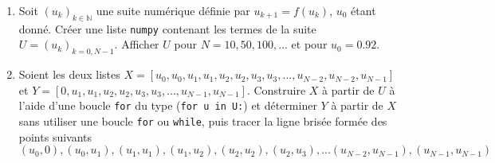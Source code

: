 \documentclass[a4paper]{article}
\begin{document}
\begin{enumerate}
 
 \item  Soit  $(u_k)_{k\in\mathbb{N}}$ une suite numérique définie par $u_{k+1}=f(u_k)$, $u_0$ étant donné. Créer une liste {\tt numpy} contenant les termes de la suite  $U=(u_k)_{k=0,N-1}$. Afficher $U$ pour $N=10, 50, 100, ...$ et pour $u_0=0.92$. 

\item Soient les deux listes $X=[u_0,u_0,u_1,u_1,u_2,u_2,u_3,u_3,...,u_{N-2},u_{N-2},u_{N-1}]$ et $Y=[0,u_1,u_1,u_2,u_2,u_3,u_3,...,u_{N-1},u_{N-1}]$. Construire $X$ à partir de $U$ à l'aide d'une boucle {\tt for} du type ({\tt for u in U:}) et déterminer $Y$ à partir de $X$ sans utiliser une boucle {\tt for} ou {\tt while}, puis tracer la ligne brisée formée des points suivants
\[(u_0,0),(u_0,u_1), (u_1,u_1), (u_1,u_2), (u_2,u_2), (u_2,u_3), ...(u_{N-2},u_{N-1}), (u_{N-1},u_{N-1})\]


\end{enumerate}
\end{document}
